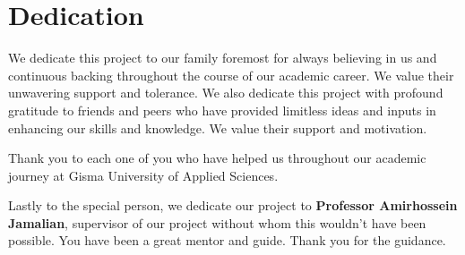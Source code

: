 \chapter*{Dedication}

We dedicate this project to our family foremost for always believing in us and continuous backing throughout the course of our academic career. We value their 
unwavering support and tolerance. We also dedicate this project with profound gratitude to friends and peers who have provided limitless ideas and inputs in 
enhancing our skills and knowledge. We value their support and motivation.

Thank you to each one of you who have helped us throughout our academic journey at Gisma University of Applied Sciences.

Lastly to the special person, we dedicate our project to \textbf {Professor Amirhossein Jamalian}, supervisor of our project without whom this wouldn't have been 
possible. You have been a great mentor and guide. Thank you for the guidance.
